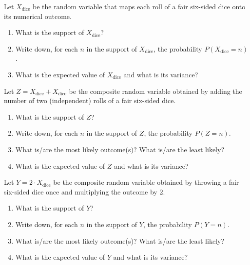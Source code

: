 \documentclass[nobib,nofonts]{tufte-handout}
\newcommand{\mult}{\ensuremath{\cdot}}
\begin{document}
\bigskip
\noindent \colorbox{mygray}{\centering
  \begin{minipage}{1.0\textwidth}

    \begin{exercise}
      Let $X_{\text{dice}}$ be the random variable that maps each roll of a fair six-sided dice onto its numerical outcome.
      \begin{enumerate}
        \item What is the support of $X_{\text{dice}}$?
        \item Write down, for each $n$ in the support of $X_{\text{dice}}$, the probability $P(X_{\text{dice}}=n)$.
        \item What is the expected value of $X_{\text{dice}}$ and what is its variance?
      \end{enumerate}
    \end{exercise}

    \begin{exercise}
      Let $Z = X_{\text{dice}} + X_{\text{dice}}$ be the composite random variable obtained by adding the number of two (independent) rolls of a fair six-sided dice.
      \begin{enumerate}
        \item What is the support of $Z$?
        \item Write down, for each $n$ in the support of $Z$, the probability $P(Z=n)$.
        \item What is/are the most likely outcome(s)? What is/are the least likely?
        \item What is the expected value of $Z$ and what is its variance?
      \end{enumerate}
    \end{exercise}

    \begin{exercise}
      Let $Y = 2 \mult X_{\text{dice}}$ be the composite random variable obtained by throwing a fair six-sided dice once and multiplying the outcome by 2.
      \begin{enumerate}
        \item What is the support of $Y$?
        \item Write down, for each $n$ in the support of $Y$, the probability $P(Y=n)$.
        \item What is/are the most likely outcome(s)? What is/are the least likely?
        \item What is the expected value of $Y$ and what is its variance?
      \end{enumerate}
    \end{exercise}

  \end{minipage}
}


\end{document}

